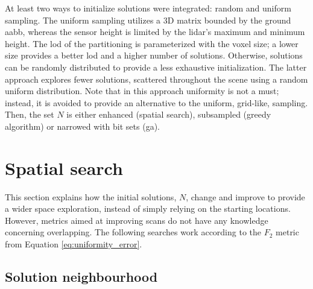 At least two ways to initialize solutions were integrated: random and uniform sampling. The uniform sampling utilizes a 3D matrix bounded by the ground \acrshort{aabb}, whereas the sensor height is limited by the \acrshort{lidar}'s maximum and minimum height. The \acrshort{lod} of the partitioning is parameterized with the voxel size; a lower size provides a better \acrshort{lod} and a higher number of solutions. Otherwise, solutions can be randomly distributed to provide a less exhaustive initialization. The latter approach explores fewer solutions, scattered throughout the scene using a random uniform distribution. Note that in this approach uniformity is not a must; instead, it is avoided to provide an alternative to the uniform, grid-like, sampling. Then, the set $N$ is either enhanced (spatial search), subsampled (greedy algorithm) or narrowed with bit sets (\acrshort{ga}). 

\section{Spatial search}

This section explains how the initial solutions, $N$, change and improve to provide a wider space exploration, instead of simply relying on the starting locations. However, metrics aimed at improving scans do not have any knowledge concerning overlapping. The following searches work according to the $F_2$ metric from Equation \ref{eq:uniformity_error}.

\subsection{Solution neighbourhood}

